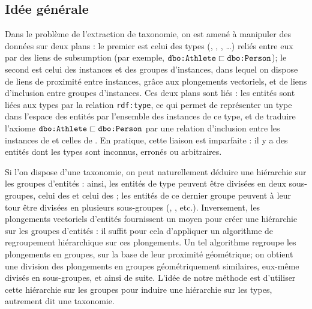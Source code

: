 
\subsection{Idée générale}

Dans le problème de l'extraction de taxonomie, on est amené à manipuler des données sur deux plans : le premier est celui des types (, , , \ldots) reliés entre eux par des liens de subsumption (par exemple, $\texttt{dbo:Athlete} \sqsubset \texttt{dbo:Person}$); le second est celui des instances et des groupes d'instances, dans lequel on dispose de liens de proximité entre instances, grâce aux plongements vectoriels, et de liens d'inclusion entre groupes d'instances. Ces deux plans sont liés : les entités sont liées aux types par la relation \texttt{rdf:type}, ce qui permet de représenter un type dans l'espace des entités par l'ensemble des instances de ce type, et de traduire l'axiome $\texttt{dbo:Athlete} \sqsubset \texttt{dbo:Person}$ par une relation d'inclusion entre les instances de  et celles de . En pratique, cette liaison est imparfaite : il y a des entités dont les types sont inconnus, erronés ou arbitraires.


Si l'on dispose d'une taxonomie, on peut naturellement déduire une hiérarchie sur les groupes d'entités : ainsi, les entités de type  peuvent être divisées en deux sous-groupes, celui des  et celui des ; les entités de ce dernier groupe peuvent à leur tour être divisées en plusieurs sous-groupes (, , etc.). Inversement, les plongements vectoriels d'entités fournissent un moyen pour créer une hiérarchie sur les groupes d'entités : il suffit pour cela d'appliquer un algorithme de regroupement hiérarchique sur ces plongements. Un tel algorithme regroupe les plongements en groupes, sur la base de leur proximité géométrique; on obtient une division des plongements en groupes géométriquement similaires, eux-même divisés en sous-groupes, et ainsi de suite. L'idée de notre méthode est d'utiliser cette hiérarchie sur les groupes pour induire une hiérarchie sur les types, autrement dit une taxonomie.

